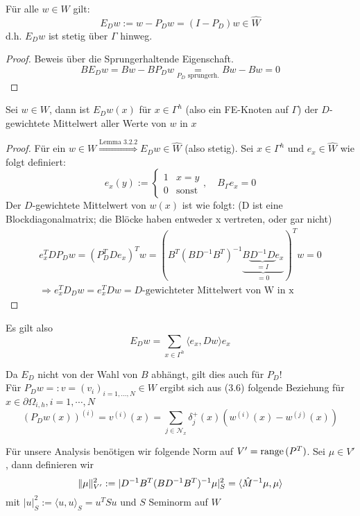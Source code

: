 \begin{lemma}%
  Für alle $w\in W$ gilt: 
  \[
    E_{D}w := w-P_Dw = (I-P_D)w \in \hat{W}
  \]
  d.h. $E_D w$ ist stetig über $\Gamma$ hinweg.
\end{lemma}

\begin{proof}
 Beweis über die Sprungerhaltende Eigenschaft. 
 \[
   BE_Dw=Bw-BP_Dw \underset{P_D\text{ sprungerh.}}{=} Bw-Bw =0
 \]
\end{proof}

\begin{lemma} %
  Sei $w\in W$, dann ist $E_Dw(x)$ für $x\in\Gamma^h$ (also ein FE-Knoten auf $\Gamma$) der $D$-gewichtete Mittelwert aller Werte von $w$ in $x$
\end{lemma}

\begin{proof}
  Für ein $w\in W \overset{\text{Lemma 3.2.2}}{\Longrightarrow} E_Dw\in \hat{W}$ (also stetig). Sei $x\in\Gamma^h$ und $e_x\in\hat{W}$ wie folgt definiert:
  \[
    e_x(y) := 
    \begin{cases}
      1& x=y\\
      0& \text{sonst}
    \end{cases},
    \quad B_\Gamma e_x =0
  \]
  Der $D$-gewichtete Mittelwert von $w(x)$ ist wie folgt: (D ist eine Blockdiagonalmatrix; die Blöcke haben entweder x vertreten, oder gar nicht)
  \begin{align*}
    e_x^TDP_Dw = (P_D^TDe_x)^Tw =(B^T(BD^{-1}B^T)^{-1} \underbrace{B\underbrace{D^{-1}D}_{=I}e_x}_{=0})^Tw=0\\
    \Rightarrow e_x^TD_Dw = e_x^TDw=D\text{-gewichteter Mittelwert von W in x}
  \end{align*}
\end{proof}

Es gilt also 
\begin{equation}%
  E_Dw = \sum_{x\in \Gamma^h} \langle e_x, Dw \rangle e_x
\end{equation}

Da $E_D$ nicht von der Wahl von $B$ abhängt, gilt dies auch für $P_D$!\\
Für $P_Dw=:v=(v_i)_{i=1,\ldots,N}\in W$ ergibt sich aus (3.6) folgende Beziehung für $x\in \partial\Omega_{i,h}, i=1,\cdots,N$
\[ %
  (P_Dw(x))^{(i)} = v^{(i)}(x) = \sum_{j\in \mathcal{N}_x} \delta_j^+(x) (w^{(i)}(x)-w^{(j)}(x))
\]

Für unsere Analysis benötigen wir folgende Norm auf $V'=\textnormal{range}\,(P^T)$. Sei $\mu\in V'$, dann definieren wir
\[%
  \norm{\mu}_{V'}^2 := |D^{-1}B^T(BD^{-1}B^T)^{-1}\mu|_S^2 = \langle\hat{M}^{-1}\mu,\mu \rangle
\]
mit $|u|_S^2:=\langle u,u \rangle_S = u^TSu$ und $S$ Seminorm auf $W$

